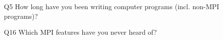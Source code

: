 \begin{description}%
\item{Q5} How long have you been writing computer programs (incl. non-MPI programs)?%
\item{Q16} Which MPI features have you never heard of?%
\end{description}%
